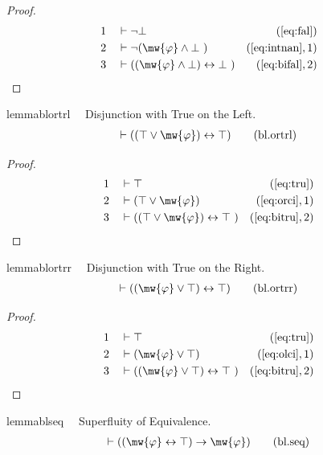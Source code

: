 \begin{proof}
\begin{align}
  1 &&  & \vdash \lnot \bot&(\mbox{\ref{eq:fal}})\notag
  \\ 2 &&  & \vdash \lnot ( \mw{\varphi} \wedge \bot
     ~)&(\mbox{\ref{eq:intnan}},1)\notag
  \\ 3 &&  & \vdash ( ( \mw{\varphi} \wedge \bot ) \leftrightarrow \bot
     ~)&(\mbox{\ref{eq:bifal}},2)\notag
\end{align}
\end{proof}

\begin{restatable}{lemma}{blortrl}~~ Disjunction with True on the Left.
\begin{align}
\vdash ( ( \top \vee \mw{\varphi} ) \leftrightarrow \top
    )\label{eq:bl.ortrl}\tag{bl.ortrl}
\end{align}
\end{restatable}

\begin{proof}
\begin{align}
  1 &&  & \vdash \top&(\mbox{\ref{eq:tru}})\notag
  \\ 2 &&  & \vdash ( \top \vee \mw{\varphi} )&(\mbox{\ref{eq:orci}},1)\notag
  \\ 3 &&  & \vdash ( ( \top \vee \mw{\varphi} ) \leftrightarrow \top
     ~)&(\mbox{\ref{eq:bitru}},2)\notag
\end{align}
\end{proof}

\begin{restatable}{lemma}{blortrr}~~ Disjunction with True on the Right.
\begin{align}
\vdash ( ( \mw{\varphi} \vee \top ) \leftrightarrow \top
    )\label{eq:bl.ortrr}\tag{bl.ortrr}
\end{align}
\end{restatable}

\begin{proof}
\begin{align}
  1 &&  & \vdash \top&(\mbox{\ref{eq:tru}})\notag
  \\ 2 &&  & \vdash ( \mw{\varphi} \vee \top )&(\mbox{\ref{eq:olci}},1)\notag
  \\ 3 &&  & \vdash ( ( \mw{\varphi} \vee \top ) \leftrightarrow \top
     ~)&(\mbox{\ref{eq:bitru}},2)\notag
\end{align}
\end{proof}

\begin{restatable}{lemma}{blseq}~~ Superfluity of Equivalence.
\begin{align}
\vdash ( ( \mw{\varphi} \leftrightarrow \top ) \rightarrow \mw{\varphi}
    )\label{eq:bl.seq}\tag{bl.seq}
\end{align}
\end{restatable}

